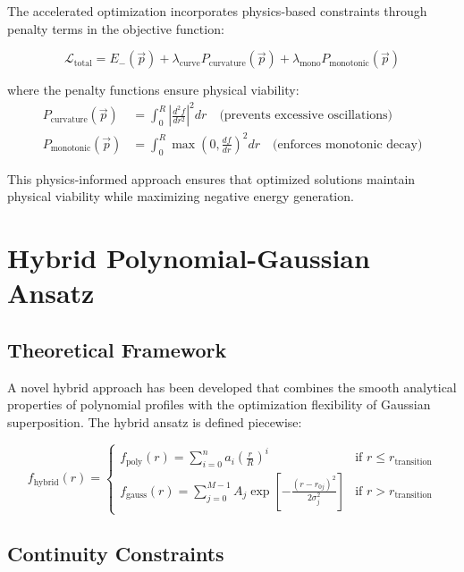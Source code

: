 \documentclass[12pt,a4paper]{article}
\begin{document}
The accelerated optimization incorporates physics-based constraints through penalty terms in the objective function:

\begin{equation}
\mathcal{L}_{\text{total}} = E_-(\vec{p}) + \lambda_{\text{curve}} P_{\text{curvature}}(\vec{p}) + \lambda_{\text{mono}} P_{\text{monotonic}}(\vec{p})
\end{equation}

where the penalty functions ensure physical viability:
\begin{align}
P_{\text{curvature}}(\vec{p}) &= \int_0^R \left|\frac{d^2f}{dr^2}\right|^2 dr \quad \text{(prevents excessive oscillations)} \\
P_{\text{monotonic}}(\vec{p}) &= \int_0^R \max\left(0, \frac{df}{dr}\right)^2 dr \quad \text{(enforces monotonic decay)}
\end{align}

This physics-informed approach ensures that optimized solutions maintain physical viability while maximizing negative energy generation.

\section{Hybrid Polynomial-Gaussian Ansatz}
\label{sec:hybrid_ansatz}

\subsection{Theoretical Framework}

A novel hybrid approach has been developed that combines the smooth analytical properties of polynomial profiles with the optimization flexibility of Gaussian superposition. The hybrid ansatz is defined piecewise:

\begin{equation}
f_{\text{hybrid}}(r) = \begin{cases}
f_{\text{poly}}(r) = \sum_{i=0}^n a_i \left(\frac{r}{R}\right)^i & \text{if } r \leq r_{\text{transition}} \\
f_{\text{gauss}}(r) = \sum_{j=0}^{M-1} A_j \exp\left[-\frac{(r - r_{0j})^2}{2\sigma_j^2}\right] & \text{if } r > r_{\text{transition}}
\end{cases}
\end{equation}

\subsection{Continuity Constraints}
\end{document}
